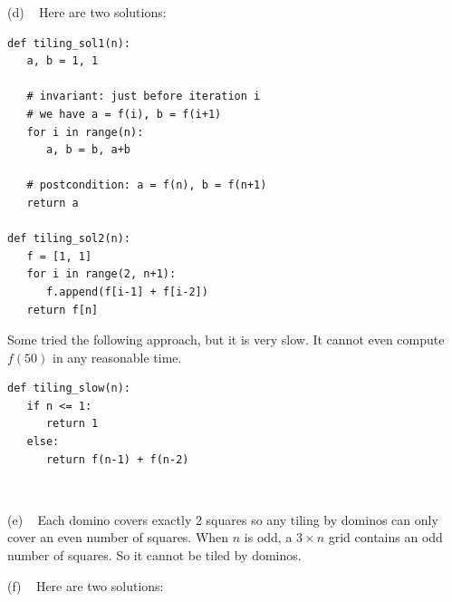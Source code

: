 \documentclass[12pt]{article}
\begin{document}
(d) ~ Here are two solutions:

\begin{verbatim}
def tiling_sol1(n):
   a, b = 1, 1

   # invariant: just before iteration i
   # we have a = f(i), b = f(i+1)
   for i in range(n):
      a, b = b, a+b

   # postcondition: a = f(n), b = f(n+1)
   return a

def tiling_sol2(n):
   f = [1, 1]
   for i in range(2, n+1):
      f.append(f[i-1] + f[i-2])
   return f[n]
\end{verbatim}

\noindent
Some tried the following approach, but it is very slow. It cannot even compute $f(50)$ in any reasonable time.
\begin{verbatim}
def tiling_slow(n):
   if n <= 1:
      return 1
   else:
      return f(n-1) + f(n-2)
\end{verbatim}
\vfill~

\newpage
{}(e) ~
Each domino covers exactly 2 squares so any tiling by dominos can only cover an even number of squares.
When $n$ is odd, a $3 \times n$ grid contains an odd number of squares. So it cannot be tiled by dominos.
\vfill

(f) ~ Here are two solutions:
\end{document}
